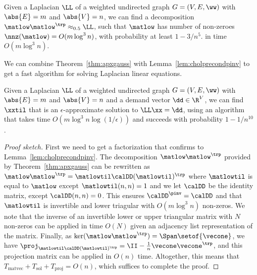 \begin{theorem}
  \label{thm:apxgauss}
Given a Laplacian $\LL$ of a weighted undirected graph $G = (V,E,\ww)$
with $\abs{E}=m$ and $\abs{V} = n$,
we can find a decomposition
$\matlow\matlow^{\trp} \approx_{0.5} \LL $, such that
$\matlow$ has number of non-zeroes $\nnz(\matlow) = O(m \log^3 n)$,
with probability at least $1 - 3/n^{5}$.
in time  $O(m \log^3 n)$.
\end{theorem}
We can combine Theorem~\ref{thm:apxgauss} with
Lemma~\ref{lem:cholprecondpinv} to get a fast algorithm for solving
Laplacian linear equations.
\begin{corollary}
  \label{cor:precondsolver}
  Given a Laplacian $\LL$ of a weighted undirected graph $G = (V,E,\ww)$
with $\abs{E}=m$ and $\abs{V} = n$ and a demand vector $\dd \in \R^V$,
we can find $\xxtil$ that is an $\epsilon$-approximate solution to
$\LL \xx = \dd$, using an algorithm that takes time $O(m \log^3 n
\log(1/\epsilon))$ and succeeds with probability $1 - 1/n^{10}$.
\end{corollary}
\begin{proof}[Proof sketch]

  First we need to get a factorization that confirms to
  Lemma~\ref{lem:cholprecondpinv}.
  The decomposition $\matlow\matlow^{\trp}$ provided by
  Theorem~\ref{thm:apxgauss} can be rewritten as
  $\matlow\matlow^{\trp} = \matlowtil \calDD (\matlowtil)^{\trp}$
  where
$\matlowtil$ is equal to $\matlow$ except $\matlowtil(n,n) = 1$
and we let $\calDD$ be the identity matrix, except $\calDD (n,n)
= 0$.
This ensures $\calDD^{\pinv} = \calDD$ and that $\matlowtil$ is
invertible and lower triagular with  $O(m \log^3 n)$ non-zeros.
We note that the inverse of an invertible lower or upper triangular
  matrix with $N$ non-zeros can be applied in time $O(N)$ given an
  adjacency list representation of the matrix.
  Finally, as $\ker(\matlow\matlow^{\trp}) = \Span\setof{\vecone}$,
we have $\proj_{ \matlowtil \calDD (\matlowtil)^{\trp}}
= \II -\frac{1}{n} \vecone \vecone^{\trp}$, and this projection matrix can be
applied in $O(n)$ time.
Altogether, this means that $T_{\text{matvec}} + T_{\text{sol}} +
T_{\text{proj}} = O(n)$, which suffices to complete the proof.
\end{proof}

